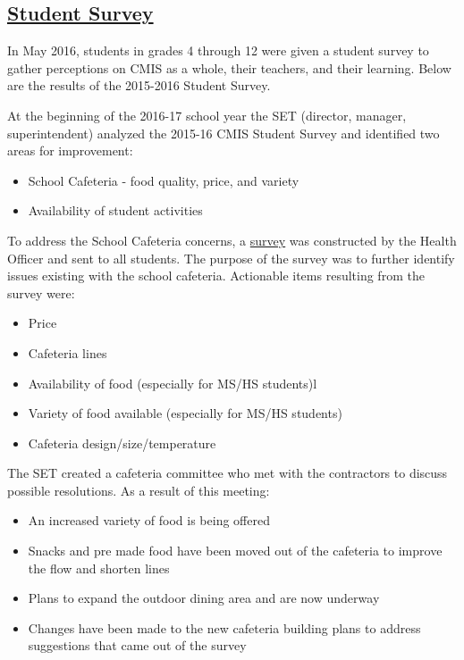 \subsection{\href{https://docs.google.com/a/cmis.ac.th/forms/d/1n7vFCQbPQmF6pEPJKPBsu4rzdiW4KQ_DrBcjTMUbLH4/viewanalytics}{Student Survey}}

In May 2016, students in grades 4 through 12 were given a student survey to gather perceptions on CMIS as a whole, their teachers, and their learning.  Below are the results of the 2015-2016 Student Survey.  


At the beginning of the 2016-17 school year the SET (director, manager, superintendent) analyzed the 2015-16 CMIS Student Survey and identified two areas for improvement:
\begin{itemize}
\item School Cafeteria - food quality, price, and variety
\item Availability of student activities
\end{itemize}



To address the School Cafeteria concerns, a \href{https://docs.google.com/a/cmis.ac.th/forms/d/18wFe46SOpPVv9_jkKLEa4OqVsDkLtJkUCcM85Jul0Ik/viewanalytics}{survey} was constructed by the Health Officer and sent to all students. The purpose of the survey was to further identify issues existing with the school cafeteria. Actionable items resulting from the survey were: 

\begin{itemize}
\item Price 
\item Cafeteria lines
\item Availability of food (especially for MS/HS students)l
\item Variety of food available (especially for MS/HS students) 
\item Cafeteria design/size/temperature
\end{itemize}


The SET created a cafeteria committee who met with the contractors to discuss possible resolutions. As a result of this meeting:
\begin{itemize}
\item An increased variety of food is being offered
\item Snacks and pre made food  have been moved out of the cafeteria to improve the flow and shorten lines
\item Plans to expand the outdoor dining area and are now underway
\item Changes have been made to the new cafeteria building plans to address suggestions that came out of the survey 
\end{itemize}

